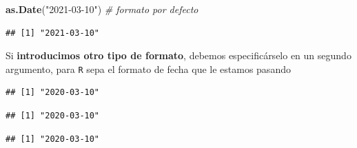 \documentclass[11pt,]{book}
\newenvironment{Shaded}{\begin{snugshade}}{\end{snugshade}}
\newcommand{\CommentTok}[1]{\textcolor[rgb]{0.37,0.37,0.37}{\textit{#1}}}
\newcommand{\KeywordTok}[1]{\textcolor[rgb]{0.27,0.27,0.27}{\textbf{#1}}}
\newcommand{\NormalTok}[1]{#1}
\newcommand{\StringTok}[1]{\textcolor[rgb]{0.5,0.5,0.5}{#1}}
\begin{document}
\begin{Shaded}
\begin{Highlighting}[]
\KeywordTok{as.Date}\NormalTok{(}\StringTok{"2021-03-10"}\NormalTok{) }\CommentTok{# formato por defecto}
\end{Highlighting}
\end{Shaded}

\begin{verbatim}
## [1] "2021-03-10"
\end{verbatim}

Si \textbf{introducimos otro tipo de formato}, debemos especificárselo en un segundo argumento, para \texttt{R} sepa el formato de fecha que le estamos pasando

\begin{Shaded}
\end{Shaded}

\begin{verbatim}
## [1] "2020-03-10"
\end{verbatim}

\begin{Shaded}
\end{Shaded}

\begin{verbatim}
## [1] "2020-03-10"
\end{verbatim}

\begin{Shaded}
\end{Shaded}

\begin{verbatim}
## [1] "2020-03-10"
\end{verbatim}

\begin{Shaded}
\end{Shaded}
\end{document}
